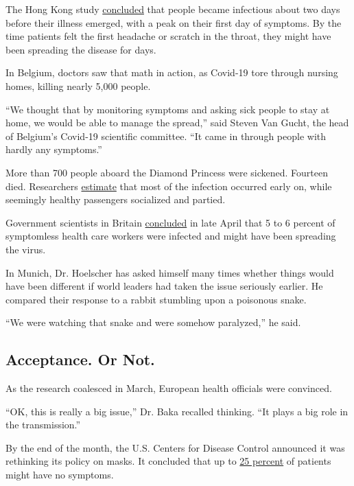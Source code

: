 The Hong Kong study
\href{https://www.nature.com/articles/s41591-020-0869-5.pdf}{concluded}
that people became infectious about two days before their illness
emerged, with a peak on their first day of symptoms. By the time
patients felt the first headache or scratch in the throat, they might
have been spreading the disease for days.

In Belgium, doctors saw that math in action, as Covid-19 tore through
nursing homes, killing nearly 5,000 people.

``We thought that by monitoring symptoms and asking sick people to stay
at home, we would be able to manage the spread,'' said Steven Van Gucht,
the head of Belgium's Covid-19 scientific committee. ``It came in
through people with hardly any symptoms.''

More than 700 people aboard the Diamond Princess were sickened. Fourteen
died. Researchers
\href{https://www.eurosurveillance.org/content/10.2807/1560-7917.ES.2020.25.10.2000180\#html_fulltext}{estimate}
that most of the infection occurred early on, while seemingly healthy
passengers socialized and partied.

Government scientists in Britain
\href{https://assets.publishing.service.gov.uk/government/uploads/system/uploads/attachment_data/file/888804/S0399_Thirtieth_SAGE_meeting_on_Covid-19_.pdf}{concluded}
in late April that 5 to 6 percent of symptomless health care workers
were infected and might have been spreading the virus.

In Munich, Dr. Hoelscher has asked himself many times whether things
would have been different if world leaders had taken the issue seriously
earlier. He compared their response to a rabbit stumbling upon a
poisonous snake.

``We were watching that snake and were somehow paralyzed,'' he said.

\hypertarget{acceptance-or-not}{%
\subsection{Acceptance. Or Not.}\label{acceptance-or-not}}

As the research coalesced in March, European health officials were
convinced.

``OK, this is really a big issue,'' Dr. Baka recalled thinking. ``It
plays a big role in the transmission.''

By the end of the month, the U.S. Centers for Disease Control announced
it was rethinking its policy on masks. It concluded that up to
\href{https://www.nytimes3xbfgragh.onion/2020/03/31/health/coronavirus-asymptomatic-transmission.html}{25
percent} of patients might have no symptoms.

